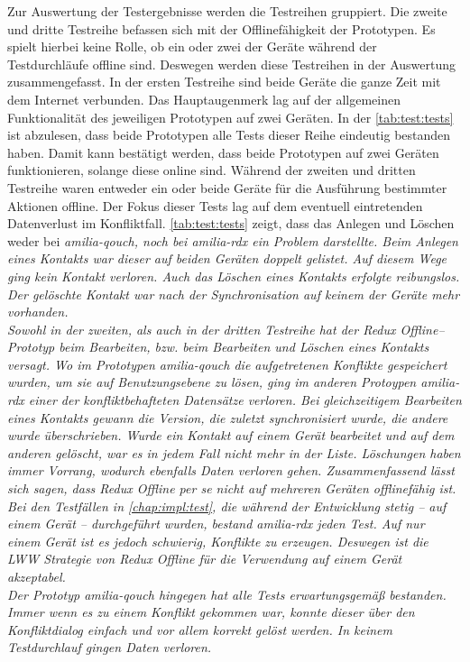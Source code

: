 Zur Auswertung der Testergebnisse werden die Testreihen gruppiert.
Die zweite und dritte Testreihe befassen sich mit der Offlinefähigkeit der Prototypen.
Es spielt hierbei keine Rolle, ob ein oder zwei der Geräte während der Testdurchläufe offline sind. Deswegen werden diese Testreihen in der Auswertung zusammengefasst.
%
%
%
In der ersten Testreihe sind beide Geräte die ganze Zeit mit dem Internet verbunden.
Das Hauptaugenmerk lag auf der allgemeinen Funktionalität des jeweiligen Prototypen auf zwei Geräten.
In der \autoref{tab:test:tests} ist abzulesen, dass beide Prototypen alle Tests dieser Reihe eindeutig bestanden haben.
Damit kann bestätigt werden, dass beide Prototypen auf zwei Geräten funktionieren, solange diese online sind.
%
%
%
Während der zweiten und dritten Testreihe waren entweder ein oder beide Geräte für die Ausführung bestimmter Aktionen offline.
Der Fokus dieser Tests lag auf dem eventuell eintretenden Datenverlust im Konfliktfall.
\autoref{tab:test:tests} zeigt, dass das Anlegen und Löschen weder bei \it{amilia-qouch}, noch bei \it{amilia-rdx} ein Problem darstellte.
Beim Anlegen eines Kontakts war dieser auf beiden Geräten doppelt gelistet. Auf diesem Wege ging kein Kontakt verloren.
Auch das Löschen eines Kontakts erfolgte reibungslos. Der gelöschte Kontakt war nach der Synchronisation auf keinem der Geräte mehr vorhanden.\\
%
Sowohl in der zweiten, als auch in der dritten Testreihe hat der Redux Offline--Prototyp beim Bearbeiten, bzw. beim Bearbeiten und Löschen eines Kontakts versagt.
Wo im Prototypen \it{amilia-qouch} die aufgetretenen Konflikte gespeichert wurden, um sie auf Benutzungsebene zu lösen, ging im anderen Protoypen \it{amilia-rdx} einer der konfliktbehafteten Datensätze verloren.
Bei gleichzeitigem Bearbeiten eines Kontakts gewann die Version, die zuletzt synchronisiert wurde, die andere wurde überschrieben.
Wurde ein Kontakt auf einem Gerät bearbeitet und auf dem anderen gelöscht, war es in jedem Fall nicht mehr in der Liste. Löschungen haben immer Vorrang, wodurch ebenfalls Daten verloren gehen.
% 
%
Zusammenfassend lässt sich sagen, dass Redux Offline per se nicht auf mehreren Geräten offlinefähig ist.
Bei den Testfällen in \autoref{chap:impl:test}, die während der Entwicklung stetig -- auf einem Gerät -- durchgeführt wurden, bestand \it{amilia-rdx} jeden Test.
Auf nur einem Gerät ist es jedoch schwierig, Konflikte zu erzeugen. Deswegen ist die \gls{LWW} Strategie von Redux Offline für die Verwendung auf einem Gerät akzeptabel.\\
Der Prototyp \it{amilia-qouch} hingegen hat alle Tests erwartungsgemäß bestanden.
Immer wenn es zu einem Konflikt gekommen war, konnte dieser über den Konfliktdialog einfach und vor allem korrekt gelöst werden.
In keinem Testdurchlauf gingen Daten verloren.
%